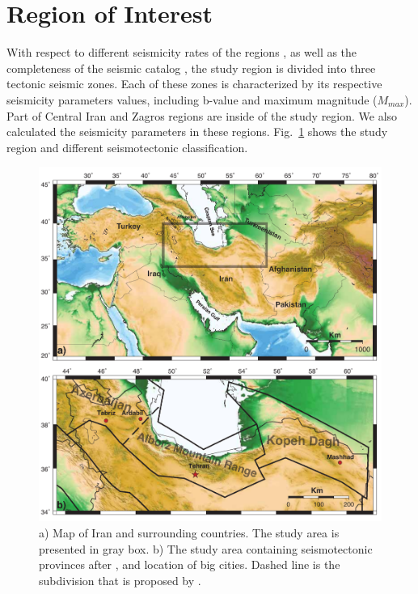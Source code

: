 
\section{Region of Interest}

With respect to different seismicity rates of the regions \citep{Nemati2015}, as well as the completeness of the seismic catalog \citep{Zare2014} , the study region is divided into three tectonic seismic zones. Each of these zones is characterized by its respective seismicity parameters values, including b-value and maximum magnitude ($M{_{max}}$). Part of Central Iran and Zagros regions are inside of the study region. We also calculated the seismicity parameters in these regions. Fig.~\ref{fig:Iran} shows the study region and different seismotectonic classification.

\begin{figure}[!ht] 
\centering
\includegraphics[scale=0.7]{figures/pdf/Figure1.pdf} 
\caption{ a) Map of Iran and surrounding countries. The study area is presented in gray box. b) The study area containing seismotectonic provinces after \citet{Mirzaei1998}, and location of big cities. Dashed line is the subdivision that is proposed by \citet{Karimiparidari2013}. }
 
\label{fig:Iran}
\end{figure}

